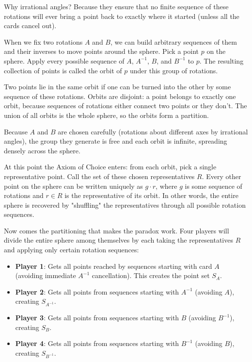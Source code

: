 Why irrational angles? Because they ensure that no finite sequence of these rotations will ever bring a point back to exactly where it started (unless all the cards cancel out).

When we fix two rotations $A$ and $B$, we can build arbitrary sequences of them and their inverses to move points around the sphere. Pick a point $p$ on the sphere. Apply every possible sequence of $A$, $A^{-1}$, $B$, and $B^{-1}$ to $p$. The resulting collection of points is called the orbit of $p$ under this group of rotations.

Two points lie in the same orbit if one can be turned into the other by some sequence of these rotations. Orbits are disjoint: a point belongs to exactly one orbit, because sequences of rotations either connect two points or they don't. The union of all orbits is the whole sphere, so the orbits form a partition.

Because $A$ and $B$ are chosen carefully (rotations about different axes by irrational angles), the group they generate is free and each orbit is infinite, spreading densely across the sphere.

At this point the Axiom of Choice enters: from each orbit, pick a single representative point. Call the set of these chosen representatives $R$. Every other point on the sphere can be written uniquely as $g \cdot r$, where $g$ is some sequence of rotations and $r \in R$ is the representative of its orbit. In other words, the entire sphere is recovered by "shuffling" the representatives through all possible rotation sequences. 

Now comes the partitioning that makes the paradox work. Four players will divide the entire sphere among themselves by each taking the representatives $R$ and applying only certain rotation sequences:

\begin{itemize}[leftmargin=*]
\item \textbf{Player 1}: Gets all points reached by sequences starting with card $A$ (avoiding immediate $A^{-1}$ cancellation). This creates the point set $S_A$.
\item \textbf{Player 2}: Gets all points from sequences starting with $A^{-1}$ (avoiding $A$), creating $S_{A^{-1}}$.
\item \textbf{Player 3}: Gets all points from sequences starting with $B$ (avoiding $B^{-1}$), creating $S_B$.
\item \textbf{Player 4}: Gets all points from sequences starting with $B^{-1}$ (avoiding $B$), creating $S_{B^{-1}}$.
\end{itemize}

